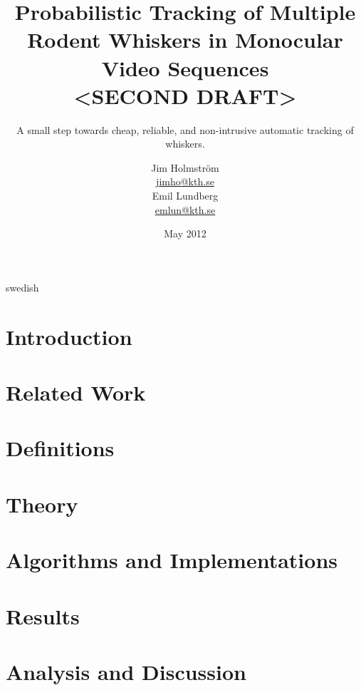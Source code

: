 \documentclass[a4paper,11pt]{kth-mag}
\title{
    Probabilistic Tracking of Multiple Rodent Whiskers in Monocular Video
    Sequences\\ <SECOND DRAFT>
}
\subtitle{
    A small step towards cheap, reliable, and non-intrusive automatic tracking of whiskers.
}
\author{
    Jim Holmström\\
    \href{mailto:jimho@kth.se}{jimho@kth.se}\\
    Emil Lundberg\\
    \href{mailto:emlun@kth.se}{emlun@kth.se}
}
\date{May 2012}
\theoremstyle{definition}
\begin{document}
\frontmatter
\pagestyle{empty}
\removepagenumbers
\maketitle
{}
\begin{abstract}
    
\end{abstract}
\clearpage
\begin{foreignabstract}{swedish}
    
\end{foreignabstract}
\clearpage
\tableofcontents*
\mainmatter
\pagestyle{newchap}
\chapter{Introduction}
    \label{sec:introduction}
    

\chapter{Related Work}
    \label{sec:related_work}
    

\chapter{Definitions}
    \label{sec:definitions}
    

\chapter{Theory}
    \label{sec:theory}
    

\chapter{Algorithms and Implementations}
    \label{sec:algorithms_implementations}
    


\chapter{Results}
    \label{sec:benchmarks_results}
    

\chapter{Analysis and Discussion}
    \label{sec:analysis_discussion}
    
\end{document}
